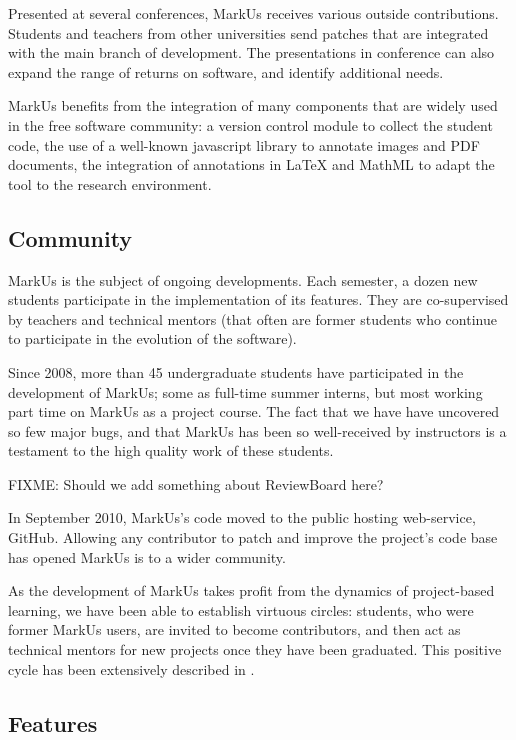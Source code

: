 \documentclass[twocolumn,10pt]{asme2e}
\begin{document}
Presented at several conferences, MarkUs receives various outside contributions. Students and teachers from other universities send patches that are integrated with the main branch of development. The presentations in conference can also expand the range of returns on software, and identify additional needs.

MarkUs benefits from the integration of many components that are widely used in the free software community: a version control module to collect the student code, the use of a well-known javascript library to annotate images and PDF documents, the integration of annotations in LaTeX and MathML to adapt the tool to the research environment. 

\subsection*{Community}
MarkUs is the subject of ongoing developments. Each semester, a dozen  new students participate in the implementation of its features. They are co-supervised by teachers and technical mentors (that often are former students who continue to participate in the evolution of the software).

Since 2008, more than 45 undergraduate students have participated in the development of MarkUs; some as full-time summer interns, but most working part time on MarkUs as a project course. The fact that we have have uncovered so few major bugs, and that MarkUs has been so well-received by instructors is a testament to the high quality work of these students.

FIXME: Should we add something about ReviewBoard here?

In September 2010, MarkUs's code moved to the public hosting web-service,
GitHub. Allowing any contributor to patch and improve the project's code base has opened MarkUs is to a wider community.

As the development of MarkUs takes profit from the dynamics of project-based learning, we have been able to establish virtuous circles: students, who were former MarkUs users, are invited to become contributors, and then act as technical mentors for new projects once they have been graduated. This positive cycle has been extensively described in \cite{magnin-qpes-2011}.

\subsection*{Features}
\label{features}
\end{document}
